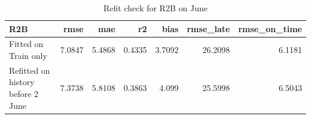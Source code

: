 \begin{table}[htbp]
\centering
\small
\caption{Refit check for R2B on June}
\begin{tabular}{lrrrrrr}
\toprule
R2B & rmse & mae & r2 & bias & rmse\_late & rmse\_on\_time \\
\midrule
Fitted on Train only & 7.0847 & 5.4868 & 0.4335 & 3.7092 & 26.2098 & 6.1181 \\
Refitted on history before 2 June & 7.3738 & 5.8108 & 0.3863 & 4.099 & 25.5998 & 6.5043 \\
\bottomrule
\end{tabular}
\par\smallskip\begin{minipage}{\linewidth}\footnotesize \end{minipage}
\end{table}

